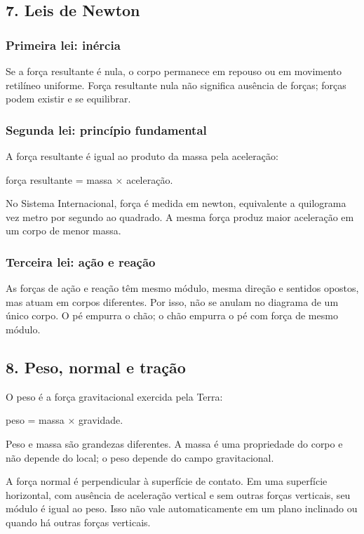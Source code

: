 \documentclass[11pt,a4paper]{article}
\begin{document}
\subsection*{7. Leis de Newton}

\subsubsection*{Primeira lei: inércia}

Se a força resultante é nula, o corpo permanece em repouso ou em movimento retilíneo uniforme. Força resultante nula não significa ausência de forças; forças podem existir e se equilibrar.

\subsubsection*{Segunda lei: princípio fundamental}

A força resultante é igual ao produto da massa pela aceleração:

força resultante = massa × aceleração.

No Sistema Internacional, força é medida em newton, equivalente a quilograma vez metro por segundo ao quadrado. A mesma força produz maior aceleração em um corpo de menor massa.

\subsubsection*{Terceira lei: ação e reação}

As forças de ação e reação têm mesmo módulo, mesma direção e sentidos opostos, mas atuam em corpos diferentes. Por isso, não se anulam no diagrama de um único corpo. O pé empurra o chão; o chão empurra o pé com força de mesmo módulo.

\subsection*{8. Peso, normal e tração}

O peso é a força gravitacional exercida pela Terra:

peso = massa × gravidade.

Peso e massa são grandezas diferentes. A massa é uma propriedade do corpo e não depende do local; o peso depende do campo gravitacional.

A força normal é perpendicular à superfície de contato. Em uma superfície horizontal, com ausência de aceleração vertical e sem outras forças verticais, seu módulo é igual ao peso. Isso não vale automaticamente em um plano inclinado ou quando há outras forças verticais.
\end{document}
